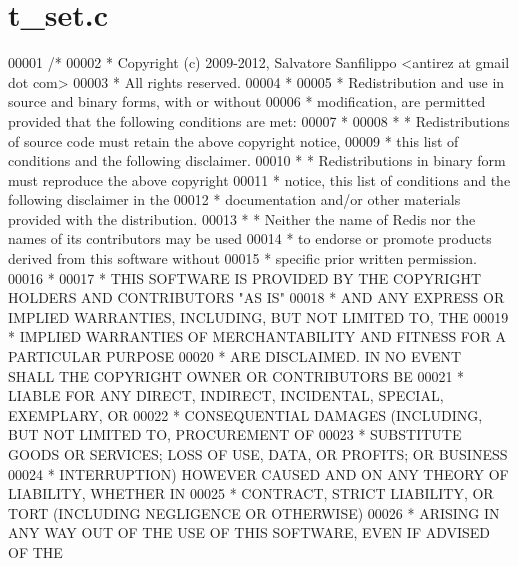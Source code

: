 \hypertarget{t__set_8c_source}{}\section{t\+\_\+set.\+c}
\label{t__set_8c_source}

\begin{DoxyCode}
00001 \textcolor{comment}{/*}
00002 \textcolor{comment}{ * Copyright (c) 2009-2012, Salvatore Sanfilippo <antirez at gmail dot com>}
00003 \textcolor{comment}{ * All rights reserved.}
00004 \textcolor{comment}{ *}
00005 \textcolor{comment}{ * Redistribution and use in source and binary forms, with or without}
00006 \textcolor{comment}{ * modification, are permitted provided that the following conditions are met:}
00007 \textcolor{comment}{ *}
00008 \textcolor{comment}{ *   * Redistributions of source code must retain the above copyright notice,}
00009 \textcolor{comment}{ *     this list of conditions and the following disclaimer.}
00010 \textcolor{comment}{ *   * Redistributions in binary form must reproduce the above copyright}
00011 \textcolor{comment}{ *     notice, this list of conditions and the following disclaimer in the}
00012 \textcolor{comment}{ *     documentation and/or other materials provided with the distribution.}
00013 \textcolor{comment}{ *   * Neither the name of Redis nor the names of its contributors may be used}
00014 \textcolor{comment}{ *     to endorse or promote products derived from this software without}
00015 \textcolor{comment}{ *     specific prior written permission.}
00016 \textcolor{comment}{ *}
00017 \textcolor{comment}{ * THIS SOFTWARE IS PROVIDED BY THE COPYRIGHT HOLDERS AND CONTRIBUTORS "AS IS"}
00018 \textcolor{comment}{ * AND ANY EXPRESS OR IMPLIED WARRANTIES, INCLUDING, BUT NOT LIMITED TO, THE}
00019 \textcolor{comment}{ * IMPLIED WARRANTIES OF MERCHANTABILITY AND FITNESS FOR A PARTICULAR PURPOSE}
00020 \textcolor{comment}{ * ARE DISCLAIMED. IN NO EVENT SHALL THE COPYRIGHT OWNER OR CONTRIBUTORS BE}
00021 \textcolor{comment}{ * LIABLE FOR ANY DIRECT, INDIRECT, INCIDENTAL, SPECIAL, EXEMPLARY, OR}
00022 \textcolor{comment}{ * CONSEQUENTIAL DAMAGES (INCLUDING, BUT NOT LIMITED TO, PROCUREMENT OF}
00023 \textcolor{comment}{ * SUBSTITUTE GOODS OR SERVICES; LOSS OF USE, DATA, OR PROFITS; OR BUSINESS}
00024 \textcolor{comment}{ * INTERRUPTION) HOWEVER CAUSED AND ON ANY THEORY OF LIABILITY, WHETHER IN}
00025 \textcolor{comment}{ * CONTRACT, STRICT LIABILITY, OR TORT (INCLUDING NEGLIGENCE OR OTHERWISE)}
00026 \textcolor{comment}{ * ARISING IN ANY WAY OUT OF THE USE OF THIS SOFTWARE, EVEN IF ADVISED OF THE}

\end{DoxyCode}

